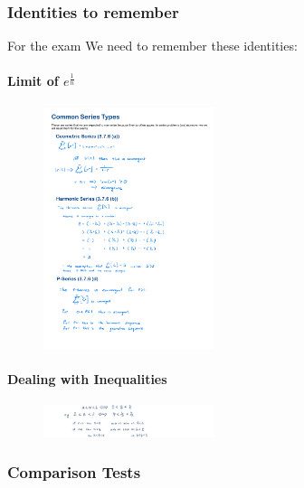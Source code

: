 \documentclass[class=article, crop=false]{standalone}
\begin{document}
\newpage
\hypertarget{header-n3241}{%
\subsubsection{Identities to remember}\label{header-n3241}}

For the exam We need to remember these identities:

\hypertarget{header-n3243}{%
\paragraph{\texorpdfstring{Limit of
\(e^\frac{1}{n}\)}{Limit of e\^{}\textbackslash frac\{1\}\{n\}}}\label{header-n3243}}

\begin{figure}
\centering
\includegraphics[width=5cm]{media/InfSeries/5E521A99-BC9F-40B8-8FE7-4B35EB40DC43.jpeg}
\caption{}
\end{figure}

\hypertarget{header-n3245}{%
\paragraph{Dealing with Inequalities}\label{header-n3245}}

\begin{figure}
\centering
\includegraphics[width=5cm]{media/InfSeries/C613EA1A-E507-4DED-8B75-9A7B87BA17C1.jpeg}
\caption{}
\end{figure}

\newpage

\hypertarget{header-n3247}{%
\subsubsection{Comparison Tests}\label{header-n3247}}
\end{document}
